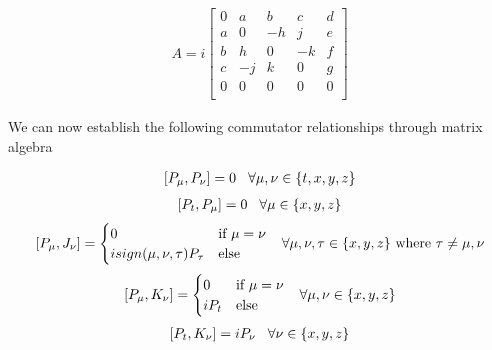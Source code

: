 \begin{equation}
\begin{aligned}A=i
	\begin{bmatrix}
		0 & a & b & c & d\\
		a & 0 & -h & j & e\\
		b & h & 0 & -k & f\\
		c & -j & k & 0 & g\\
		0 & 0 & 0 & 0 & 0\\
	\end{bmatrix}
\end{aligned}
\end{equation}

We can now establish the following commutator relationships through matrix algebra

\begin{equation}
\begin{aligned}
	[P_\mu,P_\nu] = 0 \hspace{3mm} \forall \mu,\nu\in\{t,x,y,z\}
\end{aligned}
\end{equation}
\begin{equation}
\begin{aligned}
	[P_t,P_\mu] = 0 \hspace{3mm} \forall \mu\in\{x,y,z\}
\end{aligned}
\end{equation}
\begin{equation}
\begin{aligned}
	[P_\mu,J_\nu] = \begin{cases}
							0 &\text{if } \mu=\nu \\
							isign(\mu,\nu,\tau)P_\tau & \text{else}
						\end{cases} \hspace{3mm} \forall \mu,\nu,\tau\in\{x,y,z\}\text{ where }\tau \neq\mu,\nu
\end{aligned}
\end{equation}
\begin{equation}
\begin{aligned}
	[P_\mu,K_\nu] = \begin{cases}
							0 &\text{if } \mu=\nu \\
							iP_t & \text{else}
						\end{cases} \hspace{3mm} \forall \mu,\nu\in\{x,y,z\}
\end{aligned}
\end{equation}
\begin{equation}
\begin{aligned}
	[P_t,K_\nu] = iP_\nu \hspace{3mm} \forall\nu\in\{x,y,z\}
\end{aligned}
\end{equation}
